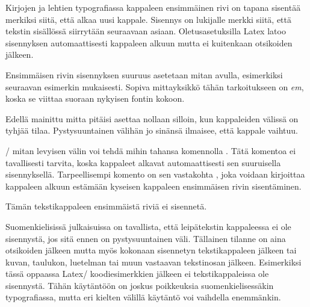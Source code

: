 Kirjojen ja lehtien typografiassa kappaleen ensimmäinen rivi on tapana
sisentää merkiksi siitä, että alkaa uusi kappale. Sisennys on lukijalle
merkki siitä, että tekstin sisällössä siirrytään seuraavaan asiaan.
Oletusasetuksilla Latex latoo sisennyksen automaattisesti kappaleen
alkuun mutta ei kuitenkaan otsikoiden jälkeen.

Ensimmäisen rivin sisennyksen suuruus asetetaan mitan 
avulla, esimerkiksi seuraavan esimerkin mukaisesti. Sopiva mittayksikkö
tähän tarkoitukseen on \emph{em}, koska se viittaa suoraan nykyisen
fontin kokoon.

\begin{koodilohkosis}
  \setlength{\parindent}{1em}
\end{koodilohkosis}

Edellä mainittu mitta pitäisi asettaa nollaan silloin, kun kappaleiden
välissä on tyhjää tilaa. Pystysuuntainen välihän jo sinänsä ilmaisee,
että kappale vaihtuu.

\begin{koodilohkosis}
  \setlength{\parskip}{1.3ex plus .2ex minus .1ex}
  \setlength{\parindent}{0em}  %
\end{koodilohkosis}

\-/ mitan levyisen välin voi tehdä mihin tahansa
komennolla . Tätä komentoa ei tavallisesti tarvita,
koska kappaleet alkavat automaattisesti sen suuruisella sisennyksellä.
Tarpeellisempi komento on sen vastakohta , joka
voidaan kirjoittaa kappaleen alkuun estämään kyseisen kappaleen
ensimmäisen rivin sisentäminen.

\begin{koodilohkosis}
  \noindent
  Tämän tekstikappaleen ensimmäistä riviä ei sisennetä.
\end{koodilohkosis}

Suomenkielisissä julkaisuissa on tavallista, että leipätekstin
kappaleessa ei ole sisennystä, jos sitä ennen on pystysuuntainen väli.
Tällainen tilanne on aina otsikoiden jälkeen mutta myös kokonaan
sisennetyn tekstikappaleen jälkeen tai kuvan, taulukon, luetelman tai
muun vastaavan tekstinosan jälkeen. Esimerkiksi tässä oppaassa Latex\-/
koodiesimerkkien jälkeen ei tekstikappaleissa ole sisennystä. Tähän
käytäntöön on joskus poikkeuksia suomenkielisessäkin typografiassa,
mutta eri kielten välillä käytäntö voi vaihdella enemmänkin.

